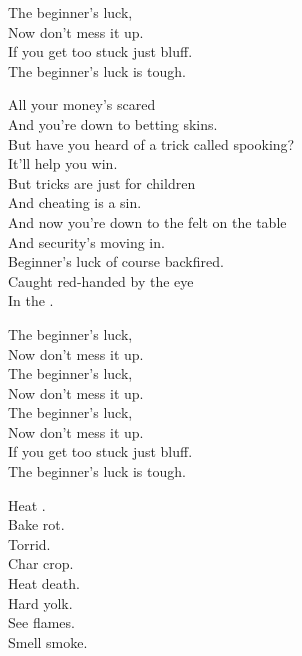 
The beginner's luck, \\
Now don't mess it up. \\
If you get too stuck just bluff. \\
The beginner's luck is tough. \\


All your money's scared \\
And you're down to betting skins. \\
But have you heard of a trick called spooking? \\
It'll help you win. \\
But tricks are just for children \\
And cheating is a sin. \\
And now you're down to the felt on the table \\
And security's moving in. \\

Beginner's luck of course backfired. \\
Caught red-handed by the eye \\
In the . \\


The beginner's luck, \\
Now don't mess it up. \\
The beginner's luck, \\
Now don't mess it up. \\
The beginner's luck, \\
Now don't mess it up. \\
If you get too stuck just bluff. \\
The beginner's luck is tough. \\





Heat . \\
Bake rot. \\
Torrid. \\
Char crop. \\
Heat death. \\
Hard yolk. \\
See flames. \\
Smell smoke. \\

